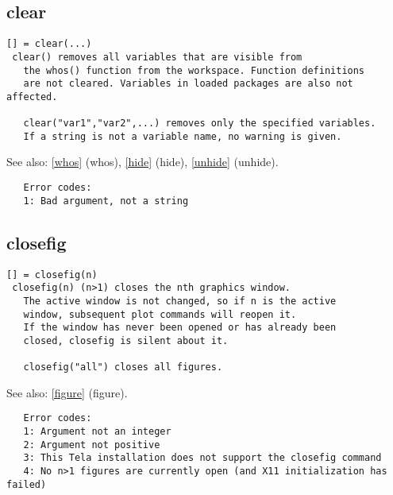 \documentclass[a4paper]{article}
\begin{document}
\subsection{clear\label{clear}}

\begin{tscreen}
\begin{verbatim}
[] = clear(...)
 clear() removes all variables that are visible from
   the whos() function from the workspace. Function definitions
   are not cleared. Variables in loaded packages are also not affected.

   clear("var1","var2",...) removes only the specified variables.
   If a string is not a variable name, no warning is given.
\end{verbatim}

See also: \ref{whos} {(whos)}, \ref{hide} {(hide)}, \ref{unhide} {(unhide)}.
\begin{verbatim}
   Error codes:
   1: Bad argument, not a string
\end{verbatim}
\end{tscreen}





\subsection{closefig\label{closefig}}

\begin{tscreen}
\begin{verbatim}
[] = closefig(n)
 closefig(n) (n>1) closes the nth graphics window.
   The active window is not changed, so if n is the active
   window, subsequent plot commands will reopen it.
   If the window has never been opened or has already been
   closed, closefig is silent about it.

   closefig("all") closes all figures.
\end{verbatim}

See also: \ref{figure} {(figure)}.
\begin{verbatim}
   Error codes:
   1: Argument not an integer
   2: Argument not positive
   3: This Tela installation does not support the closefig command
   4: No n>1 figures are currently open (and X11 initialization has failed)
   
\end{verbatim}
\end{tscreen}
\end{document}
